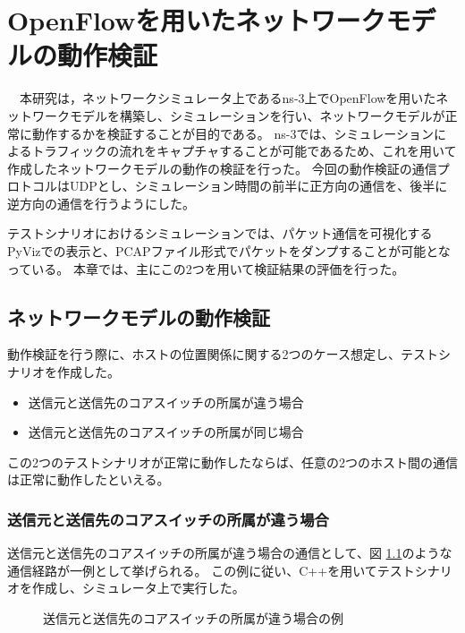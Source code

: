 \chapter{OpenFlowを用いたネットワークモデルの動作検証}

　本研究は，ネットワークシミュレータ上であるns-3上でOpenFlowを用いたネットワークモデルを構築し、シミュレーションを行い、ネットワークモデルが正常に動作するかを検証することが目的である。
ns-3では、シミュレーションによるトラフィックの流れをキャプチャすることが可能であるため、これを用いて作成したネットワークモデルの動作の検証を行った。
今回の動作検証の通信プロトコルはUDPとし、シミュレーション時間の前半に正方向の通信を、後半に逆方向の通信を行うようにした。

テストシナリオにおけるシミュレーションでは、パケット通信を可視化するPyVizでの表示と、PCAPファイル形式でパケットをダンプすることが可能となっている。
本章では、主にこの2つを用いて検証結果の評価を行った。

\section{ネットワークモデルの動作検証}

動作検証を行う際に、ホストの位置関係に関する2つのケース想定し、テストシナリオを作成した。

\begin{itemize}
	\item 送信元と送信先のコアスイッチの所属が違う場合
	\item 送信元と送信先のコアスイッチの所属が同じ場合
\end{itemize}

この2つのテストシナリオが正常に動作したならば、任意の2つのホスト間の通信は正常に動作したといえる。

\subsection{送信元と送信先のコアスイッチの所属が違う場合}

送信元と送信先のコアスイッチの所属が違う場合の通信として、図 \ref{fig:4-1}のような通信経路が一例として挙げられる。
この例に従い、C++を用いてテストシナリオを作成し、シミュレータ上で実行した。

\begin{figure}[tb]
\begin{center}
\caption{送信元と送信先のコアスイッチの所属が違う場合の例}
\label{fig:4-1}
\end{center}
\end{figure}

